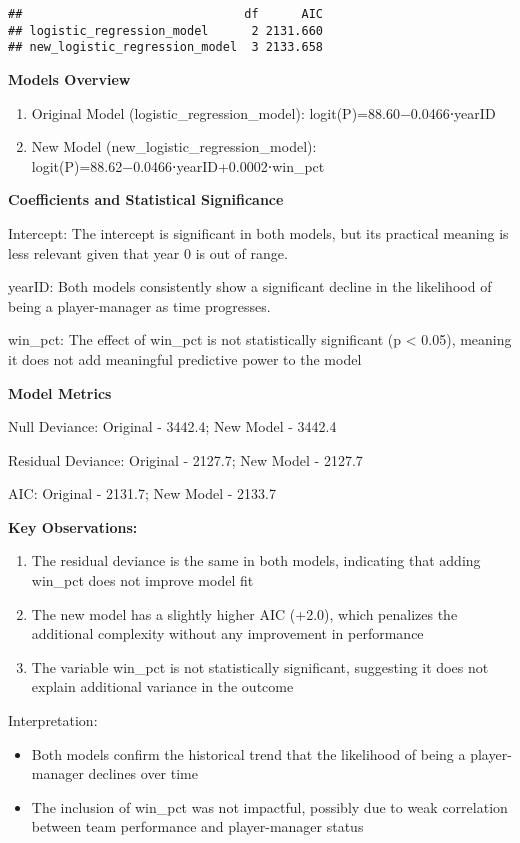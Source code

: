 \documentclass[
]{article}
\begin{document}
\begin{verbatim}
##                               df      AIC
## logistic_regression_model      2 2131.660
## new_logistic_regression_model  3 2133.658
\end{verbatim}

\textbf{Models Overview}

\begin{enumerate}
\def\labelenumi{\arabic{enumi}.}
\item
  Original Model (logistic\_regression\_model):
  logit(P)=88.60−0.0466⋅yearID
\item
  New Model (new\_logistic\_regression\_model):
  logit(P)=88.62−0.0466⋅yearID+0.0002⋅win\_pct
\end{enumerate}

\textbf{Coefficients and Statistical Significance}

Intercept: The intercept is significant in both models, but its
practical meaning is less relevant given that year 0 is out of range.

yearID: Both models consistently show a significant decline in the
likelihood of being a player-manager as time progresses.

win\_pct: The effect of win\_pct is not statistically significant (p
\textless{} 0.05), meaning it does not add meaningful predictive power
to the model

\textbf{Model Metrics}

Null Deviance: Original - 3442.4; New Model - 3442.4

Residual Deviance: Original - 2127.7; New Model - 2127.7

AIC: Original - 2131.7; New Model - 2133.7

\textbf{Key Observations:}

\begin{enumerate}
\def\labelenumi{\arabic{enumi}.}
\item
  The residual deviance is the same in both models, indicating that
  adding win\_pct does not improve model fit
\item
  The new model has a slightly higher AIC (+2.0), which penalizes the
  additional complexity without any improvement in performance
\item
  The variable win\_pct is not statistically significant, suggesting it
  does not explain additional variance in the outcome
\end{enumerate}

Interpretation:

\begin{itemize}
\item
  Both models confirm the historical trend that the likelihood of being
  a player-manager declines over time
\item
  The inclusion of win\_pct was not impactful, possibly due to weak
  correlation between team performance and player-manager status
\end{itemize}
\end{document}
